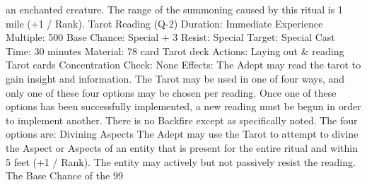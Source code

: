 \documentclass[a4paper]{article}
\begin{document}
\begin{multicols}{3}
an enchanted creature. The range of the summoning caused by this ritual is 1 mile (+1 / Rank).
Tarot Reading (Q-2)
Duration: Immediate
Experience Multiple: 500
Base Chance: Special + 3%
Resist: Special
Target: Special
Cast Time: 30 minutes
Material: 78 card Tarot deck
Actions: Laying out & reading Tarot cards
Concentration Check: None
Effects: The Adept may read the tarot to gain insight and information. The Tarot may be used in
one of four ways, and only one of these four options may be chosen per reading. Once one of these
options has been successfully implemented, a new
reading must be begun in order to implement another. There is no Backfire except as specifically
noted. The four options are:
Divining Aspects The Adept may use the Tarot to
attempt to divine the Aspect or Aspects of an entity
that is present for the entire ritual and within 5 feet
(+1 / Rank). The entity may actively but not passively resist the reading. The Base Chance of the
99


\end{multicols}
\end{document}

